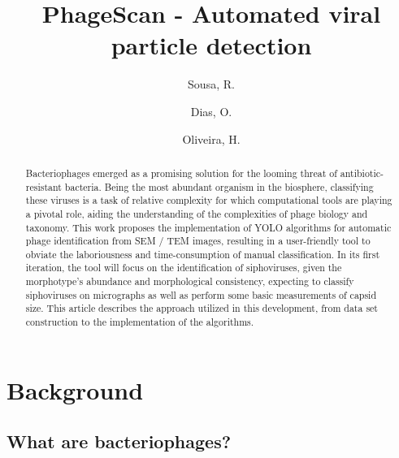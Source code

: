 \documentclass[runningheads]{llncs}
\begin{document}
%
\title{PhageScan - Automated viral particle detection}
%
%
\author{Sousa, R. \and
Dias, O. \and
Oliveira, H.}
%
%
%
\maketitle              %
%
\begin{abstract} 

Bacteriophages emerged as a promising solution for the looming threat of antibiotic-resistant bacteria. Being the most abundant organism in the biosphere, classifying these viruses is a task of relative complexity for which computational tools are playing a pivotal role, aiding the understanding of the complexities of phage biology and taxonomy. This work proposes the implementation of YOLO algorithms for automatic phage identification from SEM / TEM images, resulting in a user-friendly tool to obviate the laboriousness and time-consumption of manual classification. In its first iteration, the tool will focus on the identification of siphoviruses, given the morphotype’s abundance and morphological consistency, expecting to classify siphoviruses on micrographs as well as perform some basic measurements of capsid size. This article describes the approach utilized in this development, from data set construction to the implementation of the algorithms.

\end{abstract}
%
%
%
\section{Background}
%
%
\subsection{
What are bacteriophages?}
\end{document}
